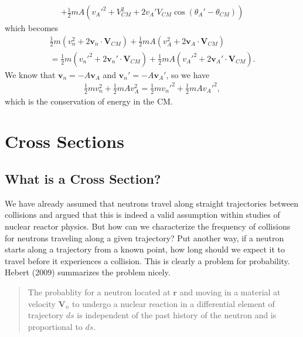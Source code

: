 \documentclass[11pt]{article}
\renewcommand\vec{\mathbf}
\begin{document}
\begin{enumerate}
\begin{align}
+ \frac{1}{2}mA (v_A'^2 + V_{CM}^2 + 2 v_A' V_{CM} \cos(\theta_A'-\theta_{CM})) 
\end{align}
which becomes
\begin{align}
  \frac{1}{2} m (v_n^2 + 2 \vec{v}_n \cdot \vec{V}_{CM} ) 
+ \frac{1}{2}mA (v_A^2 + 2 \vec{v}_A \cdot \vec{V}_{CM}) \\
= \frac{1}{2} m (v_n'^2 + 2 \vec{v}_n' \cdot \vec{V}_{CM})
+ \frac{1}{2}mA (v_A'^2 + 2 \vec{v}_A' \cdot \vec{V}_{CM}) .
\end{align}
We know that \(\vec{v}_n = -A \vec{v}_A\) and \(\vec{v}_n' = -A \vec{v}_A'\), so we have
\begin{align}
  \frac{1}{2} m v_n^2
+ \frac{1}{2}mA v_A^2
= \frac{1}{2} m v_n'^2
+ \frac{1}{2}mA v_A'^2,
\end{align}
which is the conservation of energy in the CM.
\end{enumerate}

\section{Cross Sections}
\label{sec:orgheadline27}
\subsection{What is a Cross Section?}
\label{sec:orgheadline14}
We have already assumed that neutrons travel along straight trajectories between collisions and argued that this is indeed a valid assumption within studies of nuclear reactor physics.  But how can we characterize the frequency of collisions for neutrons traveling along a given trajectory?  Put another way, if a neutron starts along a trajectory from a known point, how long should we expect it to travel before it experiences a collision.  This is clearly a problem for probability.  Hebert (2009) summarizes the problem nicely.

\begin{quote}
The probablity for a neutron located at \(\vec{r}\) and moving in a material at velocity \(\vec{V}_n\) to undergo a nuclear reaction in a differential element of trajectory \(ds\) is independent of the past history of the neutron and is proportional to \(ds\).
\end{quote}
\end{document}
